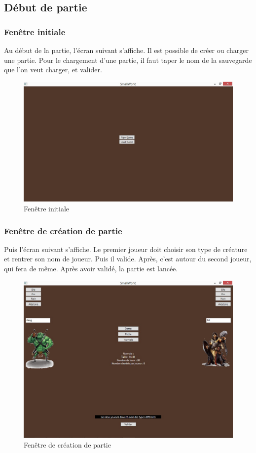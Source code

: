 \subsection{Début de partie}

\subsubsection{Fenêtre initiale}
Au début de la partie, l'écran suivant s'affiche. Il est possible de créer ou charger une partie. Pour le chargement d'une partie, il faut taper le nom de la sauvegarde que l'on veut charger, et valider.

\begin{figure}[ht!]
\centering
\includegraphics[scale=0.65]{img/init.jpg}
\caption{Fenêtre initiale}
\end{figure}
\newpage

\subsubsection{Fenêtre de création de partie}
Puis l'écran suivant s'affiche. Le premier joueur doit choisir son type de créature et rentrer son nom de joueur. Puis il valide. Après, c'est autour du second joueur, qui fera de même. Après avoir validé, la partie est lancée.

\begin{figure}[ht!]
\centering
\includegraphics[scale=0.65]{img/crea.jpg}
\caption{Fenêtre de création de partie}
\end{figure}
\newpage


